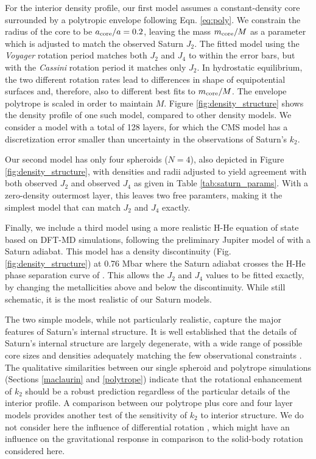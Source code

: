 For the interior density profile, our first model assumes a constant-density
core surrounded by a polytropic envelope following Eqn. \eqref{eq:poly}. We
constrain the radius of the core to be $a_{\rm core}/a=0.2$, leaving the mass
$m_{\rm core}/M$ as a parameter which is adjusted to match the observed Saturn
$J_2$.  The fitted model using the \textit{Voyager} rotation period matches
both $J_2$ and $J_4$ to within the error bars, but with the \textit{Cassini}
rotation period it matches only $J_2$.  In hydrostatic equilibrium, the two
different rotation rates lead to differences in shape of equipotential surfaces
and, therefore, also to different best fits to $m_{\rm core}/M$. The envelope
polytrope is scaled in order to maintain $M$. Figure
\ref{fig:density_structure} shows the density profile of one such model,
compared to other density models. We consider a model with a total of 128
layers, for which the CMS model has a discretization error \citep{wisdom2016}
smaller than uncertainty in the observations of Saturn's $k_2$.

Our second model has only four spheroids ($N=4$), also depicted in Figure
\ref{fig:density_structure}, with densities and radii adjusted to yield agreement
with both observed $J_2$ and observed $J_4$ as given in Table
\ref{tab:saturn_params}. With a zero-density outermost layer, this leaves two free
paramters, making it the simplest model that can match $J_2$ and $J_4$ exactly.


Finally, we include a third model using a more realistic H-He equation of state
based on DFT-MD simulations, following the preliminary Jupiter model of
\citet{hubbard2016} with a Saturn adiabat.  This model has a density
discontinuity (Fig. \ref{fig:density_structure}) at 0.76 Mbar where the Saturn
adiabat crosses the H-He phase separation curve of \citet{Morales2009}. This
allows the $J_2$ and $J_4$ values to be fitted exactly, by changing the
metallicities above and below the discontinuity. While still schematic, it is
the most realistic of our Saturn models.


The two simple models, while not particularly realistic, capture the major features
of Saturn's internal structure. It is well established that the details of Saturn's
internal structure are largely degenerate, with a wide range of possible core sizes
and densities adequately matching the few observational constraints
\citep{kramm2011,helled2013,Nettelmann2013}.  The qualitative similarities between
our single spheroid and polytrope simulations (Sections \ref{maclaurin} and
\ref{polytrope}) indicate that the rotational enhancement of $k_2$ should be a robust
prediction regardless of the particular details of the interior profile. A comparison
between our polytrope plus core and four layer models provides another test of the
sensitivity of $k_2$ to interior structure.  We do not consider here the influence of
differential rotation \citep{hubbard1982,Kong2013,cao2015,wisdom2016}, which might
have an influence on the gravitational response in comparison to the solid-body
rotation considered here.  


